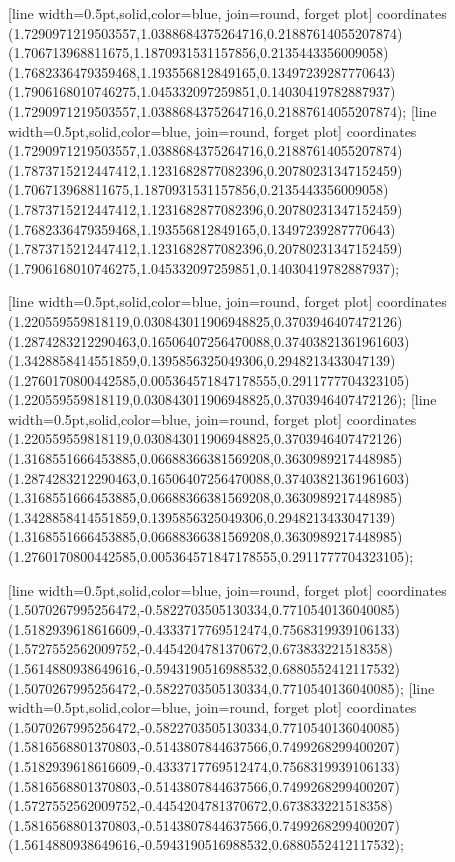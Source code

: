 [line width=0.5pt,solid,color=blue, join=round, forget plot] coordinates {(1.7290971219503557,1.0388684375264716,0.21887614055207874) (1.706713968811675,1.1870931531157856,0.2135443356009058) (1.7682336479359468,1.193556812849165,0.13497239287770643) (1.7906168010746275,1.045332097259851,0.14030419782887937) (1.7290971219503557,1.0388684375264716,0.21887614055207874)};
[line width=0.5pt,solid,color=blue, join=round, forget plot] coordinates {(1.7290971219503557,1.0388684375264716,0.21887614055207874) (1.7873715212447412,1.1231682877082396,0.20780231347152459) (1.706713968811675,1.1870931531157856,0.2135443356009058) (1.7873715212447412,1.1231682877082396,0.20780231347152459) (1.7682336479359468,1.193556812849165,0.13497239287770643) (1.7873715212447412,1.1231682877082396,0.20780231347152459) (1.7906168010746275,1.045332097259851,0.14030419782887937)};

[line width=0.5pt,solid,color=blue, join=round, forget plot] coordinates {(1.220559559818119,0.030843011906948825,0.3703946407472126) (1.2874283212290463,0.16506407256470088,0.37403821361961603) (1.3428858414551859,0.1395856325049306,0.2948213433047139) (1.2760170800442585,0.005364571847178555,0.2911777704323105) (1.220559559818119,0.030843011906948825,0.3703946407472126)};
[line width=0.5pt,solid,color=blue, join=round, forget plot] coordinates {(1.220559559818119,0.030843011906948825,0.3703946407472126) (1.3168551666453885,0.06688366381569208,0.3630989217448985) (1.2874283212290463,0.16506407256470088,0.37403821361961603) (1.3168551666453885,0.06688366381569208,0.3630989217448985) (1.3428858414551859,0.1395856325049306,0.2948213433047139) (1.3168551666453885,0.06688366381569208,0.3630989217448985) (1.2760170800442585,0.005364571847178555,0.2911777704323105)};

[line width=0.5pt,solid,color=blue, join=round, forget plot] coordinates {(1.5070267995256472,-0.5822703505130334,0.7710540136040085) (1.5182939618616609,-0.4333717769512474,0.7568319939106133) (1.5727552562009752,-0.4454204781370672,0.673833221518358) (1.5614880938649616,-0.5943190516988532,0.6880552412117532) (1.5070267995256472,-0.5822703505130334,0.7710540136040085)};
[line width=0.5pt,solid,color=blue, join=round, forget plot] coordinates {(1.5070267995256472,-0.5822703505130334,0.7710540136040085) (1.5816568801370803,-0.5143807844637566,0.7499268299400207) (1.5182939618616609,-0.4333717769512474,0.7568319939106133) (1.5816568801370803,-0.5143807844637566,0.7499268299400207) (1.5727552562009752,-0.4454204781370672,0.673833221518358) (1.5816568801370803,-0.5143807844637566,0.7499268299400207) (1.5614880938649616,-0.5943190516988532,0.6880552412117532)};


